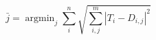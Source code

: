 \begin{equation}
  \bar{j} = \mathop{argmin}_j 
    \sum_i^{n} \sqrt{\sum_{i,j}^{m} \left| T_i - D_{i,j} \right| ^ 2}  
\label{eq:xrs1}
\end{equation}